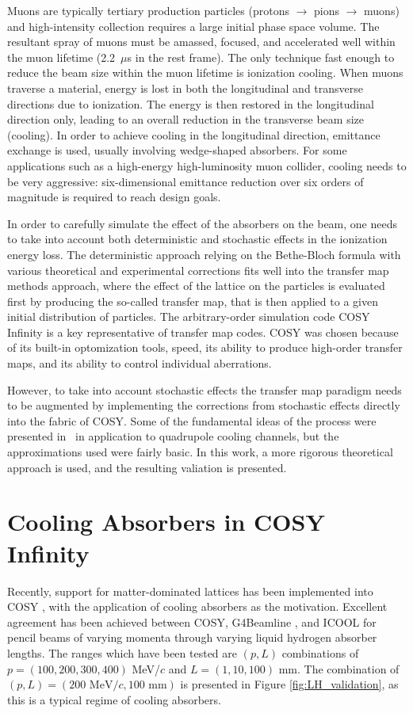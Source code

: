\documentclass{jacow}
\begin{document}
Muons are typically tertiary production particles (protons $\rightarrow$ pions $\rightarrow$ muons) and high-intensity collection requires a large initial phase space volume. The resultant spray of muons must be amassed, focused, and accelerated well within the muon lifetime (2.2~$\mu$s in the rest frame). The only technique fast enough to reduce the beam size within the muon lifetime is ionization cooling. When muons traverse a material, energy is lost in both the longitudinal and transverse directions due to ionization. The energy is then restored in the longitudinal direction only, leading to an overall reduction in the transverse beam size (cooling). In order to achieve cooling in the longitudinal direction, emittance exchange is used, usually involving wedge-shaped absorbers. For some applications such as a high-energy high-luminosity muon collider, cooling needs to be very aggressive: six-dimensional emittance reduction over six orders of magnitude is required to reach design goals.

In order to carefully simulate the effect of the absorbers on the beam, one needs to take into account both deterministic and stochastic effects in the ionization energy loss. The deterministic approach relying on the Bethe-Bloch formula with various theoretical and experimental corrections fits well into the transfer map methods approach, where the effect of the lattice on the particles is evaluated first by producing the so-called transfer map, that is then applied to a given initial distribution of particles. The arbitrary-order simulation code COSY Infinity \cite{COSY} is a key representative of transfer map codes. COSY was chosen because of its built-in optomization tools, speed, its ability to produce high-order transfer maps, and its ability to control individual aberrations. 

However, to take into account stochastic effects the transfer map paradigm needs to be augmented by implementing the corrections from stochastic effects directly into the fabric of COSY. Some of the fundamental ideas of the process were presented in~\cite{errede} in application to quadrupole cooling channels, but the approximations used were fairly basic. In this work, a more rigorous theoretical approach is used, and the resulting valiation is presented. 

\section{Cooling Absorbers in COSY Infinity}
Recently, support for matter-dominated lattices has been implemented into COSY \cite{ipac2015}, with the application of cooling absorbers as the motivation. Excellent agreement has been achieved between COSY, G4Beamline \cite{G4BL}, and ICOOL \cite{icool} for pencil beams of varying momenta through varying liquid hydrogen absorber lengths. The ranges which have been tested are $(p,L)$ combinations of $p=(100,200,300,400)$ MeV/$c$ and $L=(1,10,100)$ mm. The combination of $(p,L)=(200\text{ MeV/}c, 100\text{ mm})$ is presented in Figure \ref{fig:LH_validation}, as this is a typical regime of cooling absorbers.
\end{document}
